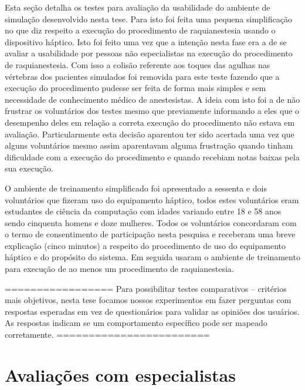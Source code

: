 Esta seção detalha os testes para avaliação da usabilidade do ambiente de simulação desenvolvido nesta tese. Para isto foi feita uma pequena simplificação no que diz respeito a execução do procedimento de raquianestesia usando o dispositivo háptico. Isto foi feito uma vez que a intenção nesta fase era a de se avaliar a usabilidade por pessoas não especialistas na execução do procedimento de raquianestesia. Com isso a colisão referente aos toques das agulhas nas vértebras dos pacientes simulados foi removida para este teste fazendo que a execução do procedimento pudesse ser feita de forma mais simples e sem necessidade de conhecimento médico de anestesistas. A ideia com isto foi a de não frustrar os voluntários dos testes mesmo que previamente informando a eles que o desempenho deles em relação a correta execução do procedimento não estava em avaliação. Particularmente esta decisão aparentou ter sido acertada uma vez que alguns voluntários mesmo assim aparentavam alguma frustração quando tinham dificuldade com a execução do procedimento e quando recebiam notas baixas pela sua execução.


O ambiente de treinamento simplificado foi apresentado a sessenta e dois voluntários que fizeram uso do equipamento háptico, todos estes voluntários eram estudantes de ciência da computação com idades variando entre 18 e 58 anos sendo cinquenta homens e doze mulheres. Todos os voluntários concordaram com o termo de consentimento de participação nesta pesquisa e receberam uma breve explicação (cinco minutos) a respeito do procedimento de uso do equipamento háptico e do propósito do sistema. Em seguida usaram o ambiente de treinamento para execução de ao menos um procedimento de raquianestesia. 

=================
Para possibilitar testes comparativos -- critérios mais objetivos, nesta tese focamos nossos experimentos em fazer perguntas com respostas esperadas em vez de questionários para validar as opiniões dos usuários. As respostas indicam se um comportamento específico pode ser mapeado corretamente.
========================

\section{Avaliações com especialistas}
\label{sec:testeEspecialistas}